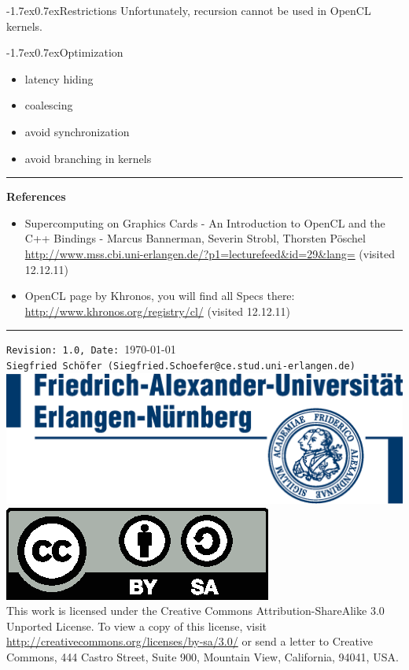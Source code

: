 \documentclass[footexclude,twocolumn,DIV25,fontsize=10pt]{scrreprt}
\makeatletter
\renewcommand{\section}{\@startsection{section}{1}{0mm}
	{-1.7ex}{0.7ex}{\normalfont\large\bfseries}}
\makeatother
\begin{document}
\section{Restrictions}
Unfortunately, recursion cannot be used in OpenCL kernels.

\section{Optimization}
\begin{itemize}
\item latency hiding
\item coalescing
\item avoid synchronization
\item avoid branching in kernels
\end{itemize}

\begin{flushright}
\footnotesize
\rule{0.7\linewidth}{0.25pt}
\textbf{References}
\begin{itemize}
  \item Supercomputing on Graphics Cards - An Introduction to OpenCL and the C++ Bindings - Marcus Bannerman, Severin Strobl, Thorsten Pöschel \url{http://www.mss.cbi.uni-erlangen.de/?p1=lecturefeed&id=29&lang=} (visited 12.12.11)
  \item OpenCL page by Khronos, you will find all Specs there: \href{http://www.khronos.org/registry/cl/}{http://www.khronos.org/registry/cl/} (visited 12.12.11)
\end{itemize}
\rule{0.7\linewidth}{0.25pt}
\verb!Revision: 1.0, Date: !\today\\
\verb!Siegfried Schöfer (Siegfried.Schoefer@ce.stud.uni-erlangen.de)!
\includegraphics[totalheight=15mm]{fau.eps}
\includegraphics[totalheight=15mm]{by-sa.eps}
\\
This work is licensed under the Creative Commons Attribution-ShareAlike 3.0 Unported License. To view a copy of this license, visit \href{http://creativecommons.org/licenses/by-sa/3.0/}{http://creativecommons.org/licenses/by-sa/3.0/} or send a letter to Creative Commons, 444 Castro Street, Suite 900, Mountain View, California, 94041, USA.
\end{flushright}
\end{document}
